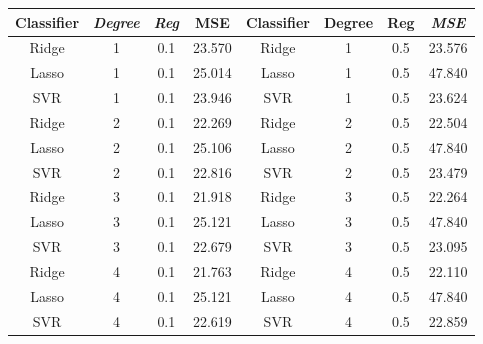 \documentclass{article}
\begin{document}
\begin{table}[H]
\centering
\begin{tabular}{cccccccc}
Classifier & \textit{Degree} & \textit{Reg} & \multicolumn{1}{c|}{MSE} & Classifier & Degree & Reg  & \textit{MSE} \\ \hline
Ridge      & 1               & 0.1          & 23.570                   & Ridge      & 1      & 0.5 & 23.576       \\
Lasso      & 1               & 0.1          & 25.014                   & Lasso      & 1      & 0.5 & 47.840       \\
SVR        & 1               & 0.1          & 23.946                   & SVR        & 1      & 0.5 & 23.624       \\
Ridge      & 2               & 0.1          & 22.269                   & Ridge      & 2      & 0.5 & 22.504       \\
Lasso      & 2               & 0.1          & 25.106                   & Lasso      & 2      & 0.5 & 47.840       \\
SVR        & 2               & 0.1          & 22.816                   & SVR        & 2      & 0.5 & 23.479       \\
Ridge      & 3               & 0.1          & 21.918                   & Ridge      & 3      & 0.5 & 22.264       \\
Lasso      & 3               & 0.1          & 25.121                   & Lasso      & 3      & 0.5 & 47.840       \\
SVR        & 3               & 0.1          & 22.679                   & SVR        & 3      & 0.5 & 23.095       \\
Ridge      & 4               & 0.1          & 21.763                   & Ridge      & 4      & 0.5 & 22.110       \\
Lasso      & 4               & 0.1          & 25.121                   & Lasso      & 4      & 0.5 & 47.840       \\
SVR        & 4               & 0.1          & 22.619                   & SVR        & 4      & 0.5 & 22.859      
\end{tabular}
\end{table}
\end{document}
